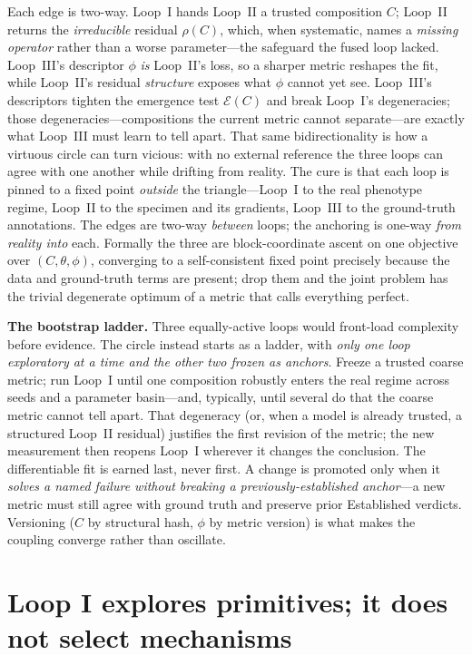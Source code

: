 \documentclass[11pt]{article}
\begin{document}
Each edge is two-way. Loop~I hands Loop~II a trusted composition $C$; Loop~II returns the \emph{irreducible} residual $\rho(C)$, which, when systematic, names a \emph{missing operator} rather than a worse parameter---the safeguard the fused loop lacked. Loop~III's descriptor $\phi$ \emph{is} Loop~II's loss, so a sharper metric reshapes the fit, while Loop~II's residual \emph{structure} exposes what $\phi$ cannot yet see. Loop~III's descriptors tighten the emergence test $\mathcal{E}(C)$ and break Loop~I's degeneracies; those degeneracies---compositions the current metric cannot separate---are exactly what Loop~III must learn to tell apart. That same bidirectionality is how a virtuous circle can turn vicious: with no external reference the three loops can agree with one another while drifting from reality. The cure is that each loop is pinned to a fixed point \emph{outside} the triangle---Loop~I to the real phenotype regime, Loop~II to the specimen and its gradients, Loop~III to the ground-truth annotations. The edges are two-way \emph{between} loops; the anchoring is one-way \emph{from reality into} each. Formally the three are block-coordinate ascent on one objective over $(C,\theta,\phi)$, converging to a self-consistent fixed point precisely because the data and ground-truth terms are present; drop them and the joint problem has the trivial degenerate optimum of a metric that calls everything perfect.

\textbf{The bootstrap ladder.} Three equally-active loops would front-load complexity before evidence. The circle instead starts as a ladder, with \emph{only one loop exploratory at a time and the other two frozen as anchors}. Freeze a trusted coarse metric; run Loop~I until one composition robustly enters the real regime across seeds and a parameter basin---and, typically, until several do that the coarse metric cannot tell apart. That degeneracy (or, when a model is already trusted, a structured Loop~II residual) justifies the first revision of the metric; the new measurement then reopens Loop~I wherever it changes the conclusion. The differentiable fit is earned last, never first. A change is promoted only when it \emph{solves a named failure without breaking a previously-established anchor}---a new metric must still agree with ground truth and preserve prior Established verdicts. Versioning ($C$ by structural hash, $\phi$ by metric version) is what makes the coupling converge rather than oscillate.

\section*{Loop I explores primitives; it does not select mechanisms}
\end{document}
